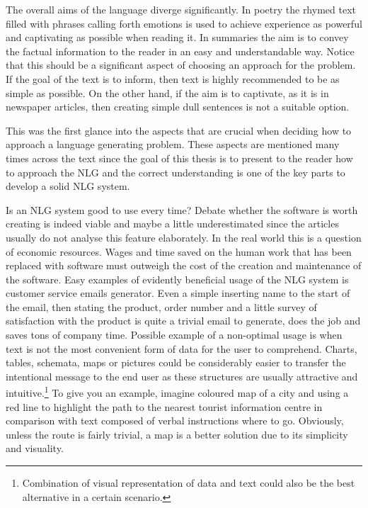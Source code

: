 The overall aims of the language diverge significantly. In poetry the rhymed text filled with phrases calling forth emotions is used to achieve experience as powerful and captivating as possible when reading it. In summaries the aim is to convey the factual information to the reader in an easy and understandable way. Notice that this should be a significant aspect of choosing an approach for the problem. If the goal of the text is to inform, then text is highly recommended to be as simple as possible. On the other hand, if the aim is to captivate, as it is in newspaper articles, then creating simple dull sentences is not a suitable option. 

This was the first glance into the aspects that are crucial when deciding how to approach a language generating problem. These aspects are mentioned many times across the text since the goal of this thesis is to present to the reader how to approach the NLG and the correct understanding is one of the key parts to develop a solid NLG system.

Is an NLG system good to use every time? Debate whether the software is worth creating is indeed viable and maybe a little underestimated since the articles usually do not analyse this feature elaborately. In the real world this is a question of economic resources. Wages and time saved on the human work that has been replaced with software must outweigh the cost of the creation and maintenance of the software. Easy examples of evidently beneficial usage of the NLG system is customer service emails generator. Even a simple inserting name to the start of the email, then stating the product, order number and a little survey of satisfaction with the product is quite a trivial email to generate, does the job and saves tons of company time. Possible example of a non-optimal usage is when text is not the most convenient form of data for the user to comprehend. Charts, tables, schemata, maps or pictures could be considerably easier to transfer the intentional message to the end user as these structures are usually attractive and intuitive.\footnote{Combination of visual representation of data and text could also be the best alternative in a certain scenario.} To give you an example, imagine coloured map of a city and using a red line to highlight the path to the nearest tourist information centre in comparison with text composed of verbal instructions where to go. Obviously, unless the route is fairly trivial, a map is a better solution due to its simplicity and visuality. 

